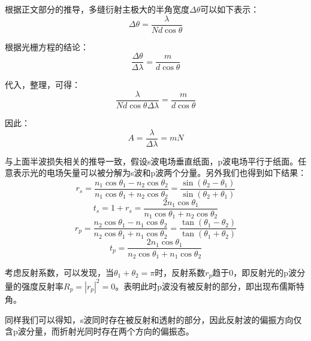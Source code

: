 \begin{prove}
  根据正文部分的推导，多缝衍射主极大的半角宽度$\Delta\theta$可以如下表示：
  \[\Delta\theta = \dfrac{\lambda}{Nd\cos\theta}\]

  根据光栅方程的结论：
  \[\dfrac{\Delta\theta}{\Delta\lambda} = \dfrac{m}{d\cos\theta}\]

  代入，整理，可得：
  \[\dfrac{\lambda}{Nd\cos\theta\Delta\lambda} = \dfrac{m}{d\cos\theta}\]

  因此：
  \[A = \dfrac{\lambda}{\Delta\lambda} = mN\]
\end{prove}

\begin{prove}
  与上面半波损失相关的推导一致，假设s波电场垂直纸面，p波电场平行于纸面。任意表示光的电场矢量可以被分解为s波和p波两个分量。另外我们也得到如下结果：
  \[r_s = \dfrac{n_1\cos\theta_1 - n_2\cos\theta_2}{n_1\cos\theta_1 + n_2\cos\theta_2} = \dfrac{\sin(\theta_2 - \theta_1)}{\sin(\theta_2 + \theta_1)}\]
  \[t_s = 1 + r_s = \dfrac{2n_1\cos\theta_1}{n_1\cos\theta_1 + n_2\cos\theta_2}\]
  \[r_p = \dfrac{n_2\cos\theta_1 - n_1\cos\theta_2}{n_2\cos\theta_1 + n_1\cos\theta_2} = \dfrac{\tan(\theta_1 - \theta_2)}{\tan(\theta_1 + \theta_2)}\]
  \[t_p = \dfrac{2 n_1 \cos\theta_1}{n_2\cos\theta_1 + n_1\cos\theta_2}\]

  考虑反射系数，可以发现，当$\theta_1 + \theta_2 = \pi$时，反射系数$r_p$趋于0，即反射光的p波分量的强度反射率$R_p = |r_p|^2 = 0$。表明此时p波没有被反射的部分，即出现布儒斯特角。

  同样我们可以得知，s波同时存在被反射和透射的部分，因此反射波的偏振方向仅含p波分量，而折射光同时存在两个方向的偏振态。
\end{prove}
